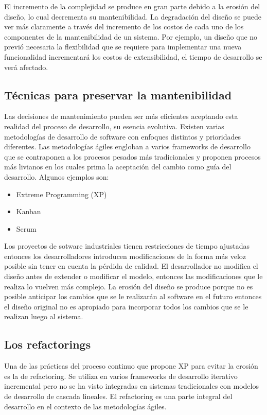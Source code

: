 El incremento de la complejidad se produce en gran parte debido a la erosión del diseño, lo cual
decrementa su mantenibilidad. La degradación del diseño se puede ver más claramente a través del
incremento de los costos de cada uno de los componentes de la mantenibilidad de un sistema. Por ejemplo,
un diseño que no previó necesaria la flexibilidad que se requiere para implementar una nueva funcionalidad
incrementará los costos de extensibilidad, el tiempo de desarrollo se verá afectado.


\subsection{Técnicas para preservar la mantenibilidad}
Las decisiones de mantenimiento pueden ser más eficientes aceptando esta realidad del proceso de
desarrollo, su esencia evolutiva. Existen varias metodologías de desarrollo de software con enfoques
distintos y prioridades diferentes. Las metodologías ágiles engloban a varios frameworks de desarrollo
que se contraponen a los procesos pesados más tradicionales y proponen procesos más livianos en los
cuales prima la aceptación del cambio como guía del desarrollo. Algunos ejemplos son:

\begin{itemize}
    \item Extreme Programming (XP)
    \item Kanban
    \item Scrum
\end{itemize}

Los proyectos de sotware industriales tienen restricciones de tiempo ajustadas entonces los
desarrolladores introducen modificaciones de la forma más veloz posible sin tener en cuenta la
pérdida de calidad. El desarrollador no modifica el diseño antes de extender o modificar el modelo,
entonces las modificaciones que le realiza lo vuelven más complejo. La erosión del diseño se produce
porque no es posible anticipar los cambios que se le realizarán al software en el futuro entonces el
diseño original no es apropiado para incorporar todos los cambios que se le realizan luego al
sistema. 


\subsection{Los refactorings}
Una de las prácticas del proceso continuo que propone XP para evitar la erosión es la de refactoring.
Se utiliza en varios frameworks de desarrollo iterativo incremental pero no se ha visto integradas en
sistemas tradicionales con modelos de desarrollo de cascada lineales. El refactoring es una parte
integral del desarrollo en el contexto de las metodologías ágiles.

